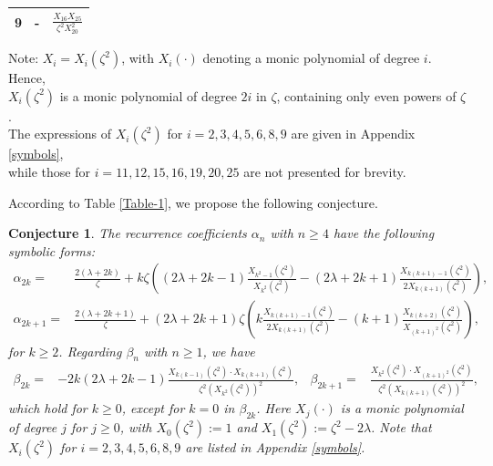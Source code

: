 \documentclass[11pt,a4paper]{article}
\newtheorem{conjecture}[theorem]{Conjecture}
\numberwithin{equation}{section}
\begin{document}
\begin{table}[H]
\begin{tabular}{|c|c|c|}
9&-&$\frac{X_{16}X_{25}}{\zeta^2X_{20}^{2}}$\\\hline
\end{tabular}
\vspace{0.4em}
\par {\small Note: $X_i=X_i(\zeta^2)$, with $X_i(\cdot)$ denoting a monic polynomial of degree $i$. Hence,\\ $X_i(\zeta^2)$ is a monic polynomial of degree $2i$ in $\zeta$, containing only even powers of $\zeta$.\\ The expressions of $X_i(\zeta^2)$ for $i=2,3,4,5,6,8,9$ are given in Appendix \ref{symbols},\\
while those for $i=11,12,15,16,19,20,25$ are not presented for brevity.}
\end{table}

According to Table \ref{Table-1}, we propose the following conjecture.
\begin{conjecture}
The recurrence coefficients $\alpha_n$ with $n\geq4$ have the following symbolic forms:
\begin{align*}
\alpha_{2k}=&\frac{2(\lambda+2k)}{\zeta}+k\zeta\left((2\lambda+2k-1)\frac{X_{k^2-1}(\zeta^2)}{X_{k^2}(\zeta^2)}-(2\lambda+2k+1)\frac{X_{k(k+1)-1}(\zeta^2)}{2X_{k(k+1)}(\zeta^2)}\right),\\ \alpha_{2k+1}=&\frac{2(\lambda+2k+1)}{\zeta}+(2\lambda+2k+1)\zeta\left(k\frac{X_{k(k+1)-1}(\zeta^2)}{2X_{k(k+1)}(\zeta^2)}-(k+1)\frac{X_{k(k+2)}(\zeta^2)}{X_{(k+1)^2}(\zeta^2)}\right),
\end{align*}
for $k\geq2$. Regarding $\beta_n$ with $n\geq 1$, we have
\begin{align*}
\beta_{2k} =& -2k(2\lambda+2k-1)\frac{X_{k(k-1)}(\zeta^2)\cdot X_{k(k+1)}(\zeta^2)}{\zeta^2 \left(X_{k^2}(\zeta^2)\right)^2},& \beta_{2k+1} =& \frac{X_{k^2}(\zeta^2)\cdot X_{(k+1)^2}(\zeta^2)}{\zeta^2 \left(X_{k(k+1)}(\zeta^2)\right)^2},
\end{align*}
which hold for $k\geq0$, except for $k=0$ in $\beta_{2k}$. Here $X_j(\cdot)$ is a monic polynomial of degree $j$ for $j\geq0$, with $X_0(\zeta^2):=1$ and $X_1(\zeta^2):=\zeta^2-2\lambda$. Note that $X_i(\zeta^2)$ for $i=2,3,4,5,6,8,9$ are listed in Appendix \ref{symbols}.
\end{conjecture}
\end{document}
